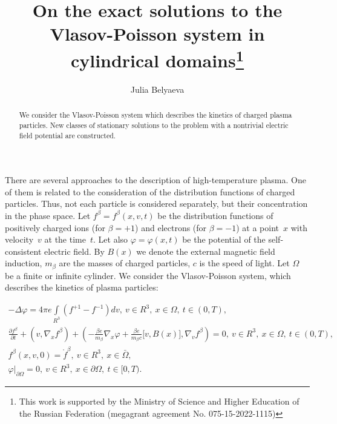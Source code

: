 \documentclass[12pt]{llncs}
\begin{document}
\fi

\title{
On the exact solutions to the Vlasov-Poisson system in  cylindrical domains\thanks{This work is supported by the Ministry of Science and Higher Education of the Russian Federation (megagrant agreement No. 075-15-2022-1115)
}}

\author{Julia Belyaeva  
}

\maketitle

\begin{abstract}
We consider the Vlasov-Poisson system which 
describes the kinetics of charged plasma particles. 
New classes of stationary solutions to the problem with a nontrivial electric field potential are constructed. 


\end{abstract}

There are several approaches to the description of high-temperature plasma. One of them is related to the consideration of the distribution functions of charged particles. Thus, not each particle is considered separately, but their concentration in the phase space.
Let $f^\beta=f^\beta(x,v,t)$
be the distribution functions
of  positively charged ions (for $\beta=+1$) 
and electrons (for $\beta=-1$) at a point~$x$ with velocity~$v$
at the time~$t$.
Let also $\varphi=\varphi(x,t)$ be the potential of the self-consistent electric field. 
By $B(x)$ we denote the external magnetic field induction, 
$m_{\beta}$ are the masses of charged particles, 
$c$ is the speed of light. Let $\Omega$ be a finite or infinite cylinder.
We consider the Vlasov-Poisson system, which describes the kinetics of plasma particles:


\begin{gather}
- \Delta \varphi= 4 \pi e \int \limits_{R^3} (f^{+1}-f^{-1})dv, \ v \in R^3,\ x \in \Omega, \ t \in (0,T),  \\
 \frac{\partial f^{\beta}}{\partial t}+\left( v, \nabla_{\!x}f^{\beta}\right)
+\left( 
-\frac{\beta e}{m_\beta}
\nabla_{\!x}\varphi+\frac{\beta e}{m_\beta c}\big[v,
B(x)\big], \nabla_{\!v}f^{\beta}\right)=0,  \ v \in R^3,\ x \in \Omega, \ t \in (0,T),\\
f^{\beta}(x,v,0)= \mathring{f}^{\beta}, \ v \in R^3,\ x \in \bar{\Omega},\\
\varphi |_{\partial \Omega}=0,  \ v \in R^3,\ x \in \partial \Omega, \ t \in [0,T).
   \end{gather}
   
\end{document}
